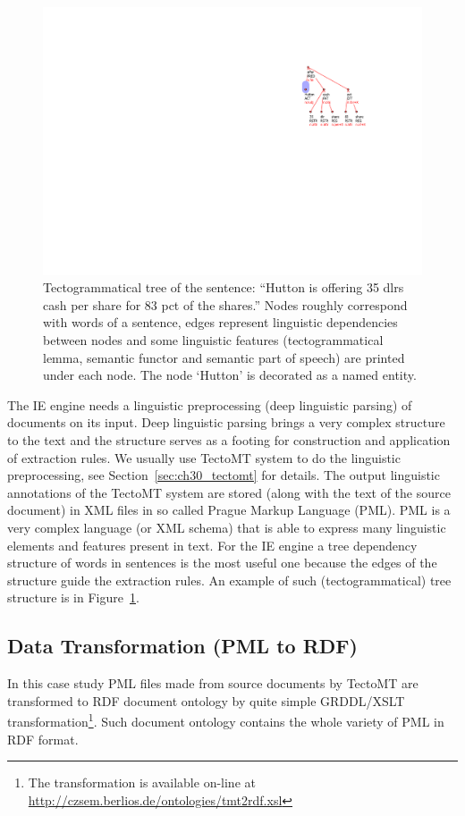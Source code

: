 \begin{figure}
\centerline{\includegraphics[angle=90, width=0.4\hsize]{tree}}
\caption{Tectogrammatical tree of the sentence: ``Hutton is offering 35 dlrs cash per share for 83 pct of the shares.''
Nodes roughly correspond with words of a sentence, edges represent linguistic dependencies between nodes and some linguistic features (tectogrammatical lemma, semantic functor and semantic part of speech) are printed under each node. The node `Hutton' is decorated as a named entity.}
\label{img:tree}
\end{figure}


The IE engine needs a linguistic preprocessing (deep linguistic parsing) of documents on its input. Deep linguistic parsing brings a very complex structure to the text and the structure serves as a footing for construction and application of extraction rules. We usually use TectoMT system to do the linguistic preprocessing, see Section~\ref{sec:ch30_tectomt} for details. The output linguistic annotations of the TectoMT system are stored (along with the text of the source document) in XML files in so called Prague Markup Language (PML). PML is a very complex language (or XML schema) that is able to express many linguistic elements and features present in text. For the IE engine a tree dependency structure of words in sentences is the most useful one because the edges of the structure guide the extraction rules. An example of such (tectogrammatical) tree structure is in Figure~\ref{img:tree}.


\subsection{Data Transformation (PML to RDF)} \label{sec:pml_to_rdf}

In this case study PML files made from source documents by TectoMT are transformed to RDF document ontology by quite simple GRDDL/XSLT transformation\footnote{The transformation is available on-line at \url{http://czsem.berlios.de/ontologies/tmt2rdf.xsl}}. Such document ontology contains the whole variety of PML in RDF format.



